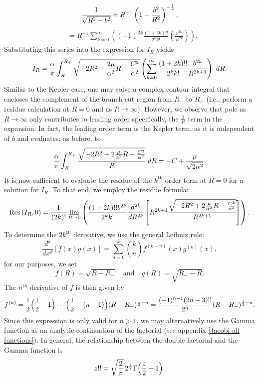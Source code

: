 \documentclass[12pt,oneside]{report}
\theoremstyle{definition}
\begin{document}
$$ \cfrac{1}{\sqrt{R^{2}-b^{2}}} = R^{-1}\left( 1- \frac{b^{2}}{R^{2}}\right)^{-\frac{1}{2}},$$
\begin{align}
    &= R^{-1} \sum_{k=0}^{\infty}\left( (-1)^{2k}\frac{(1+2k)!!}{2^{k} k!}\left(\frac{b^{2k}}{R^{2k}} \right)\right).
\end{align}
Substituting this series into the expression for $I_{R}$ yields
$$I_{R} = \frac{\alpha}{\pi}\int_{R_{-}}^{R_{+}} \sqrt{{-2R^{2}+\frac{2\mu}{\alpha^{2}} R - \frac{C^{2}}{\alpha^{2}}}} \left(\sum_{k=0}^{\infty}\cfrac{(1+2k)!!}{2^{k}k!}\cfrac{b^{2k}}{R^{2k+1}} \right) \ dR.$$
 Similar to the Kepler case, one may solve a complex contour integral that encloses the complement of the branch cut region from \(R_{-}\) to \(R_{+}\) (i.e., perform a residue calculation at \(R=0\) and as \(R\rightarrow \infty\)). However, we observe that pole as \(R\rightarrow \infty\) only contributes to leading order specifically, the \(\frac{1}{R}\) term in the expansion. In fact, the leading order term is the Kepler term, as it is independent of \(b\) and evaluates, as before, to
$$\frac{\alpha}{\pi}\int_{R_{-}}^{R_{+}}\cfrac{\sqrt{-2R^{2}+2\frac{\mu}{\alpha^{2}} R -\frac{C^{2}}{\alpha^{2}}}}{R}  \ dR = -C +\frac{\mu }{\sqrt{2\alpha^{2}}}. $$
 It is now sufficient to evaluate the residue of the \(k^{\text{th}}\) order term at \(R=0\) for a solution for \(I_{R}\). To that end, we employ the residue formula:
$$\text{Res}\left(I_{R},0\right) = \frac{1}{(2k)!}\lim_{R\rightarrow0} \left( \frac{(1+2k)!!b^{2k}}{2^{k}k!}\cfrac{d^{2k}}{dR^{2k}} \left[ R^{2k+1} \cfrac{\sqrt{-2R^{2}+2\frac{\mu}{\alpha^{2}} R -\frac{C^{2}}{\alpha^{2}}}}{R^{2k+1}} \right] \right) .$$
To determine the \(2k^{\text{th}}\) derivative, we use the general Leibniz rule:
\[
\frac{d^k}{dx^k} [f(x) g(x)] = \sum_{n=0}^{k} \binom{k}{n} f^{(k-n)}(x) g^{(n)}(x),
\]
for our purposes, we set
\[
f(R)=\sqrt{R-R_{-}} \quad \text{and} \quad g(R)=\sqrt{R_{+}-R}.
\]
The \(n^{\text{th}}\) derivative of \(f\) is then given by
\[
f^{(n)} = \frac{1}{2}\Bigl(\frac{1}{2}-1\Bigr)\cdots\Bigl(\frac{1}{2}-(n-1)\Bigr)(R-R_{-})^{\frac{1}{2}-n} = \frac{(-1)^{n-1}(2n-3)!!}{2^{n}}(R-R_{-})^{\frac{1}{2}-n}.
\]
Since this expression is only valid for \(n>1\), we may alternatively use the Gamma function as an analytic continuation of the factorial (see appendix \ref{Jacobi all functions}). In general, the relationship between the double factorial and the Gamma function is
\begin{equation}
z!! = \sqrt{\frac{2}{\pi}}\,2^{\frac{z}{2}}\Gamma\Bigl(\frac{z}{2}+1\Bigr).
\end{equation}
\end{document}

